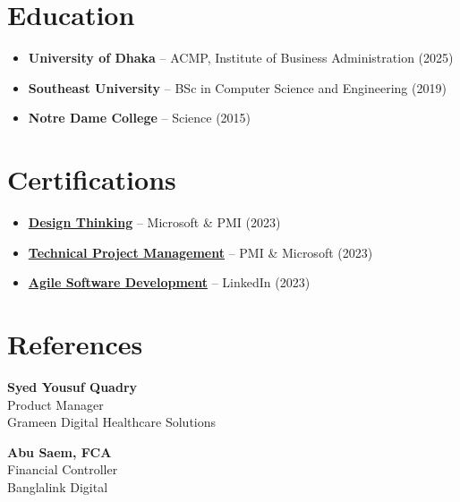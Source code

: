 \documentclass[a4paper,10pt]{article}
\begin{document}
\section*{Education}
\begin{itemize}[leftmargin=*]
    \item \textbf{University of Dhaka} – ACMP, Institute of Business Administration (2025)
    \item \textbf{Southeast University} – BSc in Computer Science and Engineering (2019)
    \item \textbf{Notre Dame College} – Science (2015)
\end{itemize}

\section*{Certifications}
\begin{itemize}[leftmargin=*]
    \item \textbf{\href{https://www.linkedin.com/learning/certificates/020adc39f55a9224f5c72e9ee45d56174b75337cb9834de2d45534c8ef2128e7}{Design Thinking}} – Microsoft \& PMI (2023)
    \item \textbf{\href{https://www.linkedin.com/learning/certificates/c94583d67c7b2c3bc4ac472c1c761f5f0dce6db0239049726cb0d69a3460eb0b}{Technical Project Management}} – PMI \& Microsoft (2023)
    \item \textbf{\href{https://www.linkedin.com/learning/certificates/f8a38ef54d303e8820573b3ec99589302564068a3af214ce0146c74161b64f6a}{Agile Software Development}} – LinkedIn (2023)
\end{itemize}

\section*{References}
\begin{minipage}[t]{0.45\textwidth}
    \textbf{Syed Yousuf Quadry} \\
    Product Manager \\
    Grameen Digital Healthcare Solutions
\end{minipage}
\hfill
\begin{minipage}[t]{0.45\textwidth}
    \textbf{Abu Saem, FCA} \\
    Financial Controller \\
    Banglalink Digital
\end{minipage}
\end{document}
